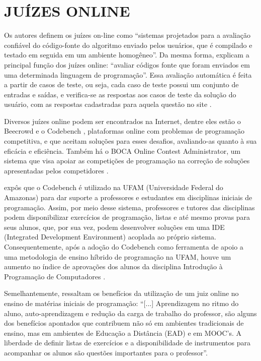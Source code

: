 \section{JUÍZES ONLINE}
Os autores \textcite{wasik} definem os juízes on-line como “sistemas projetados para a avaliação confiável do código-fonte do algoritmo enviado pelos usuários, que é compilado e testado em seguida em um ambiente homogêneo”. Da mesma forma, \textcite[p.~1]{santosribeiro} explicam a principal função dos juízes online: “avaliar códigos fonte que foram enviados em uma determinada linguagem de programação”. Essa avaliação automática é feita a partir de casos de teste, ou seja, cada caso de teste possui um conjunto de entradas e saídas, e verifica-se as respostas aos casos de teste da solução do usuário, com as respostas cadastradas para aquela questão no site \cite[p.~12]{franciscojuniorambrosio}. 

Diversos juízes online podem ser encontrados na Internet, dentre eles estão o Beecrowd \cite{cruz2022} e o Codebench \cite[p.~806]{ribeirofernandescarvalho}, plataformas online com problemas de programação competitiva, e que aceitam soluções para esses desafios, avaliando-as quanto à sua eficácia e eficiência. Também há o BOCA Online Contest Administrator, um sistema que visa apoiar as competições de programação na correção de soluções apresentadas pelos competidores \cite{camposferreira}. 

\textcite[p.~807-808]{ribeirofernandescarvalho} expôs que o Codebench é utilizado na UFAM (Universidade Federal do Amazonas) para dar suporte a professores e estudantes em disciplinas iniciais de programação. Assim, por meio desse sistema, professores e tutores das disciplinas podem disponibilizar exercícios de programação, listas e até mesmo provas para seus alunos, que, por sua vez, podem desenvolver soluções em uma IDE (Integrated Development Environment) acoplada ao próprio sistema. Consequentemente, após a adoção do Codebench como ferramenta de apoio a uma metodologia de ensino híbrido de programação na UFAM, houve um aumento no índice de aprovações dos alunos da disciplina Introdução à Programação de Computadores \cite[p.~148-149]{galvaofernandesgadelha}.

Semelhantemente, \textcite[p.~18-19]{franciscojuniorambrosio} ressaltam os benefícios da utilização de um juiz online no ensino de matérias iniciais de programação: “[...] Aprendizagem no ritmo do aluno, auto-aprendizagem e redução da carga de trabalho do professor, são alguns dos benefícios apontados que contribuem não só em ambientes tradicionais de ensino, mas em ambientes de Educação a Distância (EAD) e em MOOC’s. A liberdade de definir listas de exercícios e a disponibilidade de instrumentos para acompanhar os alunos são questões importantes para o professor”.

